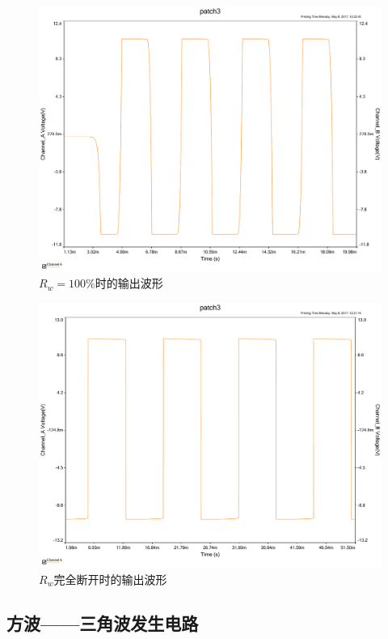 \documentclass[UTF8,a4paper]{paper}
\begin{document}
\begin{multicols}{2}
\begin{figure}[H]
\includegraphics[width=\columnwidth]{100ac.pdf}
\caption{$R_w=100\%$时的输出波形}
\label{100}
\end{figure}
\begin{figure}[H]
\centering
\includegraphics[width=\columnwidth]{offac.pdf}
\caption{$R_w$完全断开时的输出波形}
\label{infi}
\end{figure}
\end{multicols}
\subsection{方波——三角波发生电路}
\end{document}
